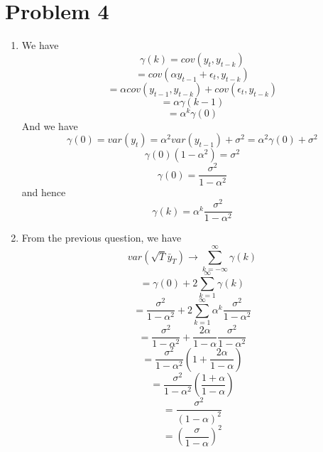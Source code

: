\documentclass[10pt,letter]{article}
\begin{document}
\section*{Problem 4}
\begin{enumerate}[label=(\alph*)]
\item We have
\[ \gamma(k) = cov(y_t, y_{t-k}) \]
\[ = cov(\alpha y_{t-1} + \epsilon_t, y_{t-k}) \]
\[ = \alpha cov(y_{t-1}, y_{t-k}) + cov(\epsilon_t, y_{t-k}) \]
\[ = \alpha \gamma(k-1) \]
\[ = \alpha^k \gamma(0) \]
And we have
\[ \gamma(0) = var(y_t) = \alpha^2 var(y_{t-1}) + \sigma^2 = \alpha^2 \gamma(0) + \sigma^2 \]
\[ \gamma(0) ( 1 - \alpha^2) = \sigma^2 \]
\[ \gamma(0) = \frac{\sigma^2}{1-\alpha^2} \]
and hence
\[ \gamma(k) = \alpha^k \frac{\sigma^2}{1-\alpha^2} \]
\item From the previous question, we have
\[ var(\sqrt{T}\bar{y}_T) \to \sum_{k=-\infty}^\infty \gamma(k) \]
\[ = \gamma(0) + 2 \sum_{k=1}^\infty \gamma(k) \]
\[ = \frac{\sigma^2}{1-\alpha^2} + 2 \sum_{k=1}^\infty \alpha^k \frac{\sigma^2}{1-\alpha^2}  \]
\[ = \frac{\sigma^2}{1-\alpha^2} + \frac{2\alpha}{1-\alpha} \frac{\sigma^2}{1-\alpha^2} \]
\[ = \frac{\sigma^2}{1-\alpha^2}\left(1  + \frac{2\alpha}{1-\alpha} \right) \]
\[ = \frac{\sigma^2}{1-\alpha^2}\left(\frac{1+\alpha}{1-\alpha} \right) \]
\[ = \frac{\sigma^2}{(1-\alpha)^2} \]
\[ = \left( \frac{\sigma}{1-\alpha}\right)^2 \]
\end{enumerate}
\end{document}

